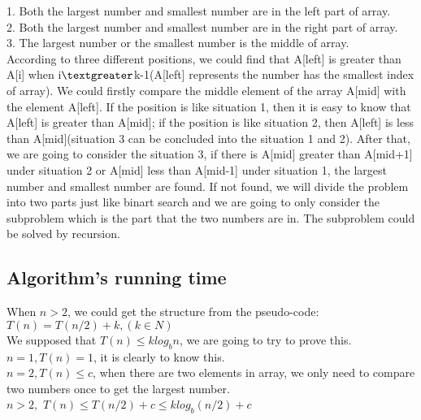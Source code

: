 \documentclass[]{article}
\begin{document}
	1. Both the largest number and smallest number are in the left part of array.   \\
	
	2. Both the largest number and smallest number are in the right part of array.   \\
	
	3. The largest number or the smallest number is the middle of array.   \\
	
	\noindent According to three different positions, we could find that A[left] is greater than A[i] when i$\textgreater$k-1(A[left] represents the number has the smallest index of array). We could firstly compare the middle element of the array A[mid] with the element A[left]. If the position is like situation 1, then it is easy to know that A[left] is greater than A[mid]; if the position is like situation 2, then A[left] is less than A[mid](situation 3 can be concluded into the situation 1 and 2). After that, we are going to consider the situation 3, if there is A[mid] greater than A[mid+1] under situation 2 or A[mid] less than A[mid-1] under situation 1, the largest number and smallest number are found. If not found, we will divide the problem into two parts just like binart search and we are going to only consider the subproblem which is the part that the two numbers are in. The subproblem could be solved by recursion. \\
	
	\subsection{Algorithm's running time}
	\noindent When $n>2$, we could get the structure from the pseudo-code: \\
	
	      $T(n) = T(n/2) + k, (k\in N) $  \\
	      
	\noindent We supposed that $T(n) \leq klog_{b}n$, we are going to try to prove this.  \\
	
	\noindent $n=1, T(n) = 1$, it is clearly to know this.   \\ 
	
	\noindent $n=2, T(n) \leq c$, when there are two elements in array, we only need to compare two numbers once to get the largest number.  \\
	
	$n>2, $ $T(n) \leq T(n/2) + c \leq klog_{b}(n/2) + c$ \\ 
	
\end{document}
